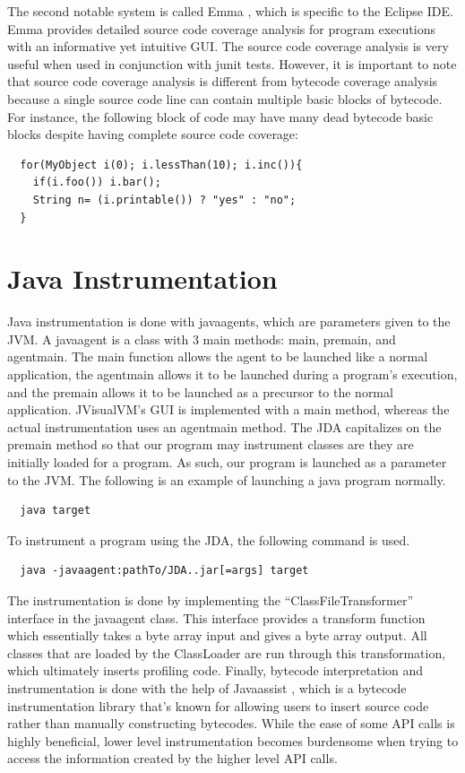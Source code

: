 \documentclass[conference,10pt,twocolumn]{./IEEE/IEEEtran}
\begin{document}
The second notable system is called Emma \cite{Emma}, which is specific to the Eclipse IDE.
Emma provides detailed source code coverage analysis for program executions with an informative yet intuitive GUI.
The source code coverage analysis is very useful when used in conjunction with junit tests.
However, it is important to note that source code coverage analysis is different from bytecode coverage analysis because a single source code line can contain multiple basic blocks of bytecode.
For instance, the following block of code may have many dead bytecode basic blocks despite having complete source code coverage:


\begin{lstlisting}
  for(MyObject i(0); i.lessThan(10); i.inc()){
    if(i.foo()) i.bar();
    String n= (i.printable()) ? "yes" : "no";
  }
\end{lstlisting}

\section{Java Instrumentation}
Java instrumentation is done with javaagents, which are parameters given to the JVM.
A javaagent is a class with 3 main methods: main, premain, and agentmain.
The main function allows the agent to be launched like a normal application, the agentmain allows it to be launched during a program’s execution, and the premain allows it to be launched as a precursor to the normal application.
JVisualVM’s GUI is implemented with a main method, whereas the actual instrumentation uses an agentmain method.
The JDA capitalizes on the premain method so that our program may instrument classes are they are initially loaded for a program.
As such, our program is launched as a parameter to the JVM.  The following is an example of launching a java program normally.

\begin{lstlisting}
  java target
\end{lstlisting}

To instrument a program using the JDA, the following command is used.

\begin{lstlisting}
  java -javaagent:pathTo/JDA..jar[=args] target
\end{lstlisting}

The instrumentation is done by implementing the “ClassFileTransformer” interface in the javaagent class.
This interface provides a transform function which essentially takes a byte array input and gives a byte array output.
All classes that are loaded by the ClassLoader are run through this transformation, which ultimately inserts profiling code.
Finally, bytecode interpretation and instrumentation is done with the help of Javaassist \cite{Javaassist}, which is a bytecode instrumentation library that’s known for allowing users to insert source code rather than manually constructing bytecodes.
While the ease of some API calls is highly beneficial, lower level instrumentation becomes burdensome when trying to access the information created by the higher level API calls.
\end{document}
